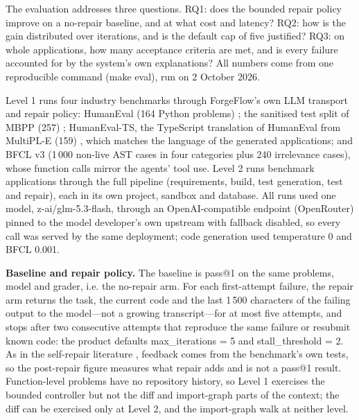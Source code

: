 \documentclass[pdflatex,sn-mathphys-num]{sn-jnl}%
\theoremstyle{thmstyleone}%
\theoremstyle{thmstyletwo}%
\theoremstyle{thmstylethree}%
\begin{document}
The evaluation addresses three questions. RQ1: does the bounded repair policy improve on a no-repair baseline, and at what cost and latency? RQ2: how is the gain distributed over iterations, and is the default cap of five justified? RQ3: on whole applications, how many acceptance criteria are met, and is every failure accounted for by the system's own explanations? All numbers come from one reproducible command (make eval), run on 2 October 2026.

Level 1 runs four industry benchmarks through ForgeFlow's own LLM transport and repair policy: HumanEval (164 Python problems) \cite{r25chen}; the sanitised test split of MBPP (257) \cite{r26austin}; HumanEval-TS, the TypeScript translation of HumanEval from MultiPL-E (159) \cite{r27cassano}, which matches the language of the generated applications; and BFCL v3 \cite{r28patil} (1\,000 non-live AST cases in four categories plus 240 irrelevance cases), whose function calls mirror the agents' tool use. Level 2 runs benchmark applications through the full pipeline (requirements, build, test generation, test and repair), each in its own project, sandbox and database. All runs used one model, z-ai/glm-5.3-flash, through an OpenAI-compatible endpoint (OpenRouter) pinned to the model developer's own upstream with fallback disabled, so every call was served by the same deployment; code generation used temperature 0 and BFCL 0.001.

\textbf{Baseline and repair policy.} The baseline is pass@1 on the same problems, model and grader, i.e. the no-repair arm. For each first-attempt failure, the repair arm returns the task, the current code and the last 1\,500 characters of the failing output to the model---not a growing transcript---for at most five attempts, and stops after two consecutive attempts that reproduce the same failure or resubmit known code: the product defaults max\_iterations = 5 and stall\_threshold = 2. As in the self-repair literature \cite{r29chen,r30olausson}, feedback comes from the benchmark's own tests, so the post-repair figure measures what repair adds and is not a pass@1 result. Function-level problems have no repository history, so Level 1 exercises the bounded controller but not the diff and import-graph parts of the context; the diff can be exercised only at Level 2, and the import-graph walk at neither level.%
\end{document}
